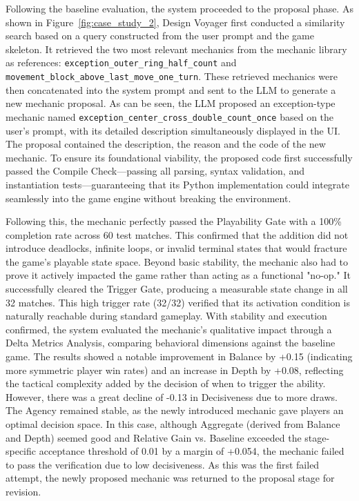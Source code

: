 \documentclass[conference]{IEEEtran}
\begin{document}
Following the baseline evaluation, the system proceeded to the proposal phase. As shown in Figure~\ref{fig:case_study_2}, Design Voyager first conducted a similarity search based on a query constructed from the user prompt and the game skeleton. It retrieved the two most relevant mechanics from the mechanic library as references: \texttt{exception\_outer\_ring\_half\_count} and \texttt{movement\_block\_above\_last\_move\_one\_turn}. These retrieved mechanics were then concatenated into the system prompt and sent to the LLM to generate a new mechanic proposal. As can be seen, the LLM proposed an exception-type mechanic named \texttt{exception\_center\_cross\_double\_count\_once} based on the user's prompt, with its detailed description simultaneously displayed in the UI. The proposal contained the description, the reason and the code of the new mechanic. To ensure its foundational viability, the proposed code first successfully passed the Compile Check—passing all parsing, syntax validation, and instantiation tests—guaranteeing that its Python implementation could integrate seamlessly into the game engine without breaking the environment. 

Following this, the mechanic perfectly passed the Playability Gate with a 100\% completion rate across 60 test matches. This confirmed that the addition did not introduce deadlocks, infinite loops, or invalid terminal states that would fracture the game's playable state space. Beyond basic stability, the mechanic also had to prove it actively impacted the game rather than acting as a functional "no-op." It successfully cleared the Trigger Gate, producing a measurable state change in all 32 matches. This high trigger rate (32/32) verified that its activation condition is naturally reachable during standard gameplay. With stability and execution confirmed, the system evaluated the mechanic's qualitative impact through a Delta Metrics Analysis, comparing behavioral dimensions against the baseline game. The results showed a notable improvement in Balance by +0.15 (indicating more symmetric player win rates) and an increase in Depth by +0.08, reflecting the tactical complexity added by the decision of when to trigger the ability. However, there was a great decline of -0.13 in Decisiveness due to more draws. The Agency remained stable, as the newly introduced mechanic gave players an optimal decision space. In this case, although Aggregate (derived from Balance and Depth) seemed good and Relative Gain vs. Baseline exceeded the stage-specific acceptance threshold of 0.01 by a margin of +0.054, the mechanic failed to pass the verification due to low decisiveness. As this was the first failed attempt, the newly proposed mechanic was returned to the proposal stage for revision.
\end{document}
